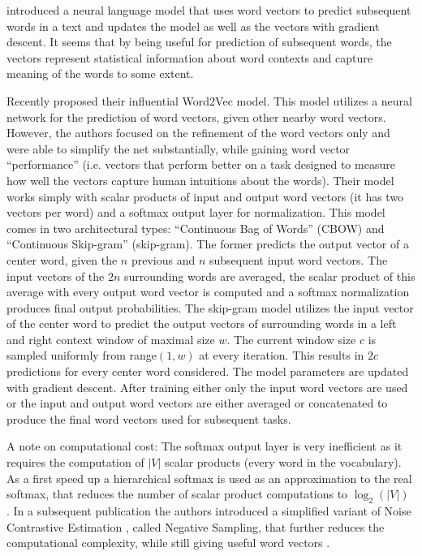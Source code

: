 \citet{Bengio2003} introduced a neural language model that uses
word vectors to predict subsequent words in a text and updates the
model as well as the vectors with gradient descent. It seems that
by being useful for prediction of subsequent words, the vectors represent
statistical information about word contexts and capture meaning of
the words to some extent.

Recently \citet{Mikolov2013a} proposed their influential Word2Vec model.
This model utilizes a neural network for the prediction of word vectors,
given other nearby word vectors. However, the authors focused on the
refinement of the word vectors only and were able to simplify the
net substantially, while gaining word vector ``performance'' (i.e.
vectors that perform better on a task designed to measure how well
the vectors capture human intuitions about the words). Their model
works simply with scalar products of input and output word vectors
(it has two vectors per word) and a softmax output layer for normalization.
This model comes in two architectural types: ``Continuous Bag of Words''
(CBOW) and ``Continuous Skip-gram'' (skip-gram). The former predicts
the output vector of a center word, given the $n$ previous and
$n$ subsequent input word vectors. The input vectors of the $2n$
surrounding words are averaged, the scalar product of this average
with every output word vector is computed and a softmax normalization
produces final output probabilities. The skip-gram model utilizes
the input vector of the center word to predict the output vectors
of surrounding words in a left and right context window of maximal
size $w$. The current window size $c$ is sampled uniformly from
range$(1,w)$ at every iteration. This results in $2c$ predictions
for every center word considered. The model parameters are updated
with gradient descent. After training either only the input word vectors
are used or the input and output word vectors are either averaged
or concatenated to produce the final word vectors used for subsequent
tasks. 

A note on computational cost: The softmax output layer is very inefficient
as it requires the computation of $|V|$ scalar products (every word
in the vocabulary). As a first speed up a hierarchical softmax \citep{Morin2005} is
used as an approximation to the real softmax, that reduces the number
of scalar product computations to $\log_{2}(|V|)$ \citep{Mikolov2013a}.
In a subsequent publication the authors introduced a
simplified variant of Noise Contrastive Estimation \citep{Gutmann2012}, called
Negative Sampling, that further reduces the computational complexity,
while still giving useful word vectors \citep{Mikolov2013b}. 

